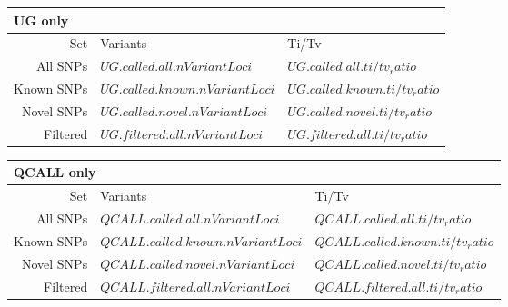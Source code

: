 \documentclass[10pt]{article}
\begin{document}
    \begin{multicols}{2}
        \hfill
        \begin{tabular}{|r|l|l|}
            \multicolumn{3}{l}{\bfseries{UG only}} \\
            \hline
            Set & Variants & Ti/Tv \\
            \hline
            All SNPs & $UG.called.all.nVariantLoci$ & $UG.called.all.ti/tv_ratio$ \\
            Known SNPs & $UG.called.known.nVariantLoci$ & $UG.called.known.ti/tv_ratio$ \\
            Novel SNPs & $UG.called.novel.nVariantLoci$ & $UG.called.novel.ti/tv_ratio$ \\
            Filtered & $UG.filtered.all.nVariantLoci$ & $UG.filtered.all.ti/tv_ratio$ \\
            \hline
        \end{tabular}

        \begin{tabular}{|r|l|l|}
            \multicolumn{3}{l}{\bfseries{QCALL only}} \\
            \hline
            Set & Variants & Ti/Tv \\
            \hline
            All SNPs & $QCALL.called.all.nVariantLoci$ & $QCALL.called.all.ti/tv_ratio$ \\
            Known SNPs & $QCALL.called.known.nVariantLoci$ & $QCALL.called.known.ti/tv_ratio$ \\
            Novel SNPs & $QCALL.called.novel.nVariantLoci$ & $QCALL.called.novel.ti/tv_ratio$ \\
            Filtered & $QCALL.filtered.all.nVariantLoci$ & $QCALL.filtered.all.ti/tv_ratio$ \\
            \hline
        \end{tabular}
    \end{multicols}

    \lfoot{}
    \cfoot{}
\end{document}
